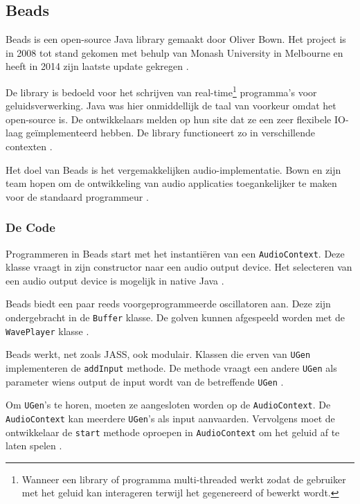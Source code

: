 \subsection{Beads}

Beads is een open-source Java library gemaakt door Oliver Bown. Het project is in 2008 tot stand gekomen met behulp van Monash University in Melbourne en heeft in 2014 zijn laatste update gekregen \autocite{beads}.

De library is bedoeld voor het schrijven van real-time\footnote{Wanneer een library of programma multi-threaded werkt zodat de gebruiker met het geluid kan interageren terwijl het gegenereerd of bewerkt wordt.} programma's voor geluidsverwerking. Java was hier onmiddellijk de taal van voorkeur omdat het open-source is. De ontwikkelaars melden op hun site dat ze een zeer flexibele IO-laag geïmplementeerd hebben. De library functioneert zo in verschillende contexten \autocite{beads}. 

Het doel van Beads is het vergemakkelijken audio-implementatie. Bown en zijn team hopen om de ontwikkeling van audio applicaties toegankelijker te maken voor de standaard programmeur \autocite{beads2}.

\subsubsection*{De Code}

Programmeren in Beads start met het instantiëren van een \verb+AudioContext+. Deze klasse vraagt in zijn constructor naar een audio output device. Het selecteren van een audio output device is mogelijk in native Java \autocite{beadsdocs}.

Beads biedt een paar reeds voorgeprogrammeerde oscillatoren aan. Deze zijn ondergebracht in de \verb+Buffer+ klasse. De golven kunnen afgespeeld worden met de \verb+WavePlayer+ klasse \autocite{beadsdocs}.

Beads werkt, net zoals JASS, ook modulair. Klassen die erven van \verb+UGen+ implementeren de \verb+addInput+ methode. De methode vraagt een andere \verb+UGen+ als parameter wiens output de input wordt van de betreffende \verb+UGen+ \autocite{beadsdocs}.

Om \verb+UGen+'s te horen, moeten ze aangesloten worden op de \verb+AudioContext+. De \verb+AudioContext+ kan meerdere \verb+UGen+'s als input aanvaarden. Vervolgens moet de ontwikkelaar de \verb+start+ methode oproepen in \verb+AudioContext+ om het geluid af te laten spelen \autocite{beadsdocs}.

